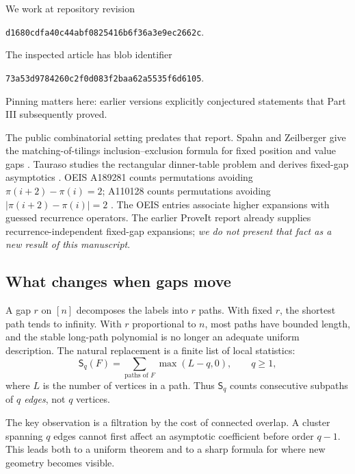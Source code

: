 \documentclass[11pt]{article}
\numberwithin{equation}{section}
\theoremstyle{definition}
\theoremstyle{remark}
\theoremstyle{definition}
\begin{document}
We work at repository revision
\begin{center}\small
\texttt{d1680cdfa40c44abf0825416b6f36a3e9ec2662c}.
\end{center}
The inspected article has blob identifier
\begin{center}\small
\texttt{73a53d9784260c2f0d083f2baa62a5535f6d6105}.
\end{center}
Pinning matters here: earlier versions explicitly conjectured statements
that Part III subsequently proved.

The public combinatorial setting predates that report. Spahn and
Zeilberger give the matching-of-tilings inclusion--exclusion formula for
fixed position and value gaps \cite{spahn}. Tauraso studies the rectangular
dinner-table problem and derives fixed-gap asymptotics \cite{tauraso}.
OEIS A189281 counts permutations avoiding
$\pi(i+2)-\pi(i)=2$; A110128 counts permutations avoiding
$|\pi(i+2)-\pi(i)|=2$ \cite{oeis189281,oeis110128}. The OEIS entries associate
higher expansions with guessed recurrence operators. The earlier ProveIt
report already supplies recurrence-independent fixed-gap expansions;
\emph{we do not present that fact as a new result of this manuscript}.

\subsection{What changes when gaps move}

A gap $r$ on $[n]$ decomposes the labels into $r$ paths. With fixed $r$,
the shortest path tends to infinity. With $r$ proportional to $n$, most
paths have bounded length, and the stable long-path polynomial is no
longer an adequate uniform description. The natural replacement is a
finite list of local statistics:
\begin{equation}
 \mathsf S_q(F)=\sum_{\text{paths of }F}\max(L-q,0),
 \qquad q\ge1,
 \label{spf:mg:eq:Sq-intro}
\end{equation}
where $L$ is the number of vertices in a path. Thus $\mathsf S_q$ counts
consecutive subpaths of \emph{$q$ edges}, not $q$ vertices.

The key observation is a filtration by the cost of connected overlap.
A cluster spanning $q$ edges cannot first affect an asymptotic coefficient
before order $q-1$. This leads both to a uniform theorem and to a sharp
formula for where new geometry becomes visible.
\end{document}
